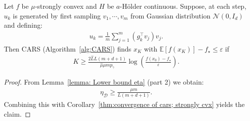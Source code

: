 \begin{corollary}
    Let $f$ be $\mu$-strongly convex and $H$ be $a$-H\"{o}lder continuous. Suppose, at each step, $u_k$ is generated by first sampling $v_1,\cdots, v_m$ from Gaussian distribution $\mathcal{N}(0, I_d)$ and defining:
    \begin{align*}
        u_k = \frac{1}{m}\sum_{j=1}^{m} (g_k^{\top}v_j) v_j.
    \end{align*}
    Then CARS (Algorithm~\ref{alg:CARS}) finds $x_K$ with $\mathbb{E}[f(x_K)] - f_\star \leq \varepsilon$ if
    \begin{align*}
        K \geq \frac{2\hat{L}L(m+d+1)}{\hat{\mu}\mu mp_{\gamma}} \log\left(\frac{f(x_0) - f_\star}{\varepsilon} \right).
    \end{align*}
\end{corollary}
\begin{proof}
    From Lemma~\ref{lemma: Lower bound eta} (part 2) we obtain:
    \begin{align*}
        \eta_\mathcal{D} \geq \frac{\mu m}{L(m+d+1)}.
    \end{align*}
    Combining this with Corollary~\ref{thm:convergence of cars; strongly cvx} yields the claim.
\end{proof}
